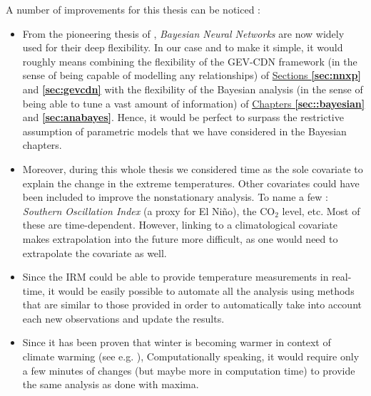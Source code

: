 \documentclass[11pt,a4paper,openany, twosided]{book}
\begin{document}
A number of improvements for this thesis can be noticed : 

\begin{itemize} 
\item From the pioneering thesis of \citet{Neal_1996_bay}, \emph{Bayesian Neural Networks} are now widely used for their deep flexibility. In our case and to make it simple, it would roughly means combining the flexibility of the GEV-CDN framework (in the sense of being capable of modelling any relationships)  of \hyperref[sec:nnxp]{Sections \textbf{\ref{sec:nnxp}}} and \hyperref[sec:gevcdn]{ \textbf{\ref{sec:gevcdn}}} with the flexibility of the  Bayesian analysis (in the sense of being able to tune a vast amount of information) of \hyperref[sec::bayesian]{ Chapters \textbf{\ref{sec::bayesian}}} and \textbf{\ref{sec:anabayes}}. Hence, it would be perfect to surpass the restrictive assumption of parametric models that we have considered in the Bayesian chapters.


\item Moreover, during this whole thesis we considered time as the sole covariate to explain the change in the extreme temperatures. Other covariates could have been included to improve the nonstationary analysis. To name a few : \emph{Southern Oscillation Index} (a proxy for El Niño), the $\text{CO}_2$ level, etc. Most of these are time-dependent.
However, linking to a climatological covariate makes
extrapolation into the future more difficult, as one would need to extrapolate the 
covariate as well. 

\item Since the IRM could be able to provide temperature measurements in real-time, it would be easily possible to automate all the analysis using methods that are similar to those provided in order to automatically take into account each new observations and update the results.

\item Since it has been proven that winter is becoming warmer in context of climate warming (see e.g. \citet{Ribes2017}), 
Computationally speaking, it would require only a few minutes of changes (but maybe more in computation time) to provide the same analysis as done with maxima.

\end{itemize}
\end{document}
